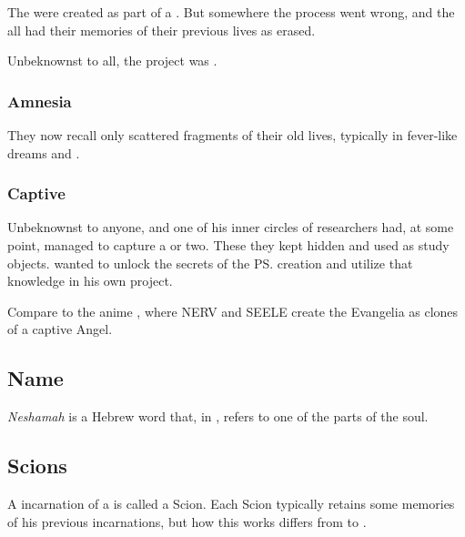 The \malachim{} were created as part of a .
But somewhere the process went wrong, and the \Malachim{} all had their memories of their previous lives as \resphain{} erased. 

Unbeknownst to all, the project was . 





\subsubsection{Amnesia}
They now recall only scattered fragments of their old lives, typically in fever-like dreams and \deajvus. 





\subsubsection{Captive \malach}
Unbeknownst to anyone, \Azraid{} and one of his inner circles of researchers had, at some point, managed to capture a \malach{} or two. 
These they kept hidden and used as study objects. 
\Azraid{} wanted to unlock the secrets of the \ps{\malachim} creation and utilize that knowledge in his own  project. 

Compare to the anime \cite{Anime:NeonGenesisEvangelion}, where NERV and SEELE create the Evangelia as clones of a captive Angel. 









\subsection{Name}
\emph{Neshamah} is a Hebrew word that, in \Cabbalah, refers to one of the  parts of the \human soul.









\subsection{Scions}
A \human{} incarnation of a \Malach{} is called a Scion. 
Each Scion typically retains some memories of his previous incarnations, but how this works differs from \Malach{} to \Malach. 

